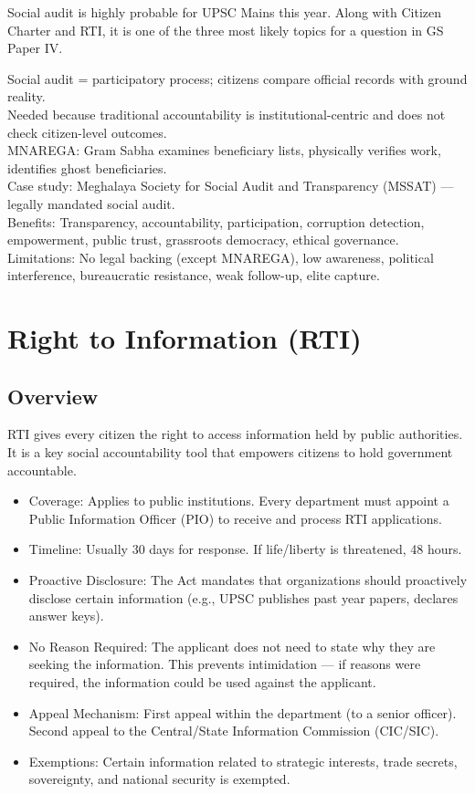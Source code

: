 \begin{CriticalPoint}
Social audit is highly probable for UPSC Mains this year. Along with Citizen Charter and RTI, it is one of the three most likely topics for a question in GS Paper IV.
\end{CriticalPoint}

\begin{QuickRevision}
Social audit = participatory process; citizens compare official records with ground reality.\\
Needed because traditional accountability is institutional-centric and does not check citizen-level outcomes.\\
MNAREGA: Gram Sabha examines beneficiary lists, physically verifies work, identifies ghost beneficiaries.\\
Case study: Meghalaya Society for Social Audit and Transparency (MSSAT) --- legally mandated social audit.\\
Benefits: Transparency, accountability, participation, corruption detection, empowerment, public trust, grassroots democracy, ethical governance.\\
Limitations: No legal backing (except MNAREGA), low awareness, political interference, bureaucratic resistance, weak follow-up, elite capture.
\end{QuickRevision}

\section{Right to Information (RTI)}

\subsection{Overview}
RTI gives every citizen the right to access information held by public authorities. It is a key social accountability tool that empowers citizens to hold government accountable.
\begin{itemize}
\item Coverage: Applies to public institutions. Every department must appoint a Public Information Officer (PIO) to receive and process RTI applications.
\item Timeline: Usually 30 days for response. If life/liberty is threatened, 48 hours.
\item Proactive Disclosure: The Act mandates that organizations should proactively disclose certain information (e.g., UPSC publishes past year papers, declares answer keys).
\item No Reason Required: The applicant does not need to state why they are seeking the information. This prevents intimidation --- if reasons were required, the information could be used against the applicant.
\item Appeal Mechanism: First appeal within the department (to a senior officer). Second appeal to the Central/State Information Commission (CIC/SIC).
\item Exemptions: Certain information related to strategic interests, trade secrets, sovereignty, and national security is exempted.
\end{itemize}

